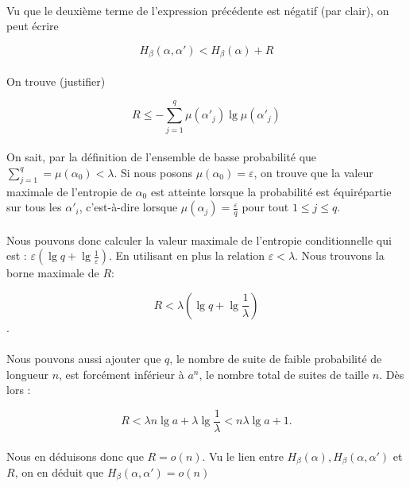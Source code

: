 	\paragraph{}
	Vu que le deuxième terme de l'expression précédente est négatif 
	(par clair), on peut écrire
	
	\[H_\beta(\alpha,\alpha') < H_\beta(\alpha) + R\]
	
	\paragraph{}
	On trouve (justifier)
	
	\[R \le -\sum_{j=1}^q\mu(\alpha'_j)\lg\mu(\alpha'_j)\]
	
	\paragraph{}
	On sait, par la définition de l'ensemble de basse probabilité que 
	$\sum_{j=1}^q =\mu(\alpha_0) < \lambda$. Si nous posons 
	$\mu(\alpha_0)=\varepsilon$, on trouve que la valeur maximale 
	de l'entropie de $\alpha_0$ est atteinte lorsque la probabilité 
	est équirépartie sur tous les $\alpha'_i$, c'est-à-dire lorsque
	 $\mu(\alpha_j)=\frac{\varepsilon}{q}$ pour tout $1\le j\le q$.
	
	\paragraph{}
	Nous pouvons donc calculer la valeur maximale de l'entropie conditionnelle
	qui est : $\varepsilon \left(\lg q+\lg\frac{1}{\varepsilon}\right)$.
	En utilisant en plus la relation $\varepsilon < \lambda$. Nous trouvons la
	borne maximale de $R$:
	
	\[R<\lambda\left(\lg q+\lg\frac{1}{\lambda}\right)\].
	
	\paragraph{}
	Nous pouvons aussi ajouter que $q$, le nombre de suite de faible 
	probabilité de longueur $n$, est forcément inférieur à $a^n$, le 
	nombre total de suites de taille $n$.
	Dès lors :
	
	\[R<\lambda n\lg a +\lambda \lg \frac{1}{\lambda}<n\lambda\lg a+1.\]
	
	\paragraph{}
	Nous en déduisons donc que $R=o(n)$. Vu le lien entre 
	$H_\beta(\alpha),H_\beta(\alpha,\alpha')$ et $R$, 
	on en déduit que $H_\beta(\alpha,\alpha')=o(n)$
	
